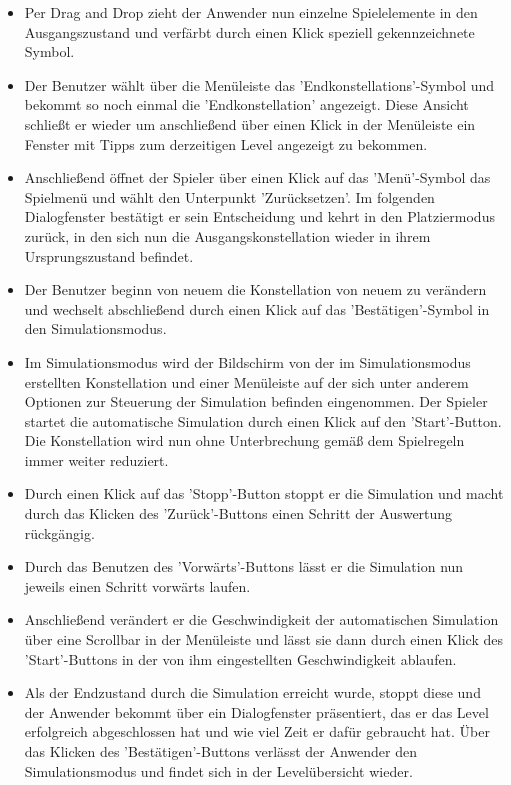 \begin{requirements}
\begin{itemize}
  			\item Per Drag and Drop zieht der Anwender nun einzelne Spielelemente in den Ausgangszustand und verfärbt durch einen Klick speziell gekennzeichnete Symbol.
  			
  			\item Der Benutzer wählt über die Menüleiste das 'Endkonstellations'-Symbol und bekommt so noch einmal die 'Endkonstellation' angezeigt. Diese Ansicht schließt er wieder um anschließend über einen Klick in der Menüleiste ein Fenster mit Tipps zum derzeitigen Level angezeigt zu bekommen. 
  			
  			\item Anschließend öffnet der Spieler über einen Klick auf das 'Menü'-Symbol das Spielmenü und wählt den Unterpunkt 'Zurücksetzen'. Im folgenden Dialogfenster bestätigt er sein Entscheidung und kehrt in den Platziermodus zurück, in den sich nun die Ausgangskonstellation wieder in ihrem Ursprungszustand befindet. 
  			
  			\item Der Benutzer beginn von neuem die Konstellation von neuem zu verändern und wechselt abschließend durch einen Klick auf das 'Bestätigen'-Symbol in den Simulationsmodus.
  			
  			\item Im Simulationsmodus wird der Bildschirm von der im Simulationsmodus erstellten Konstellation und einer Menüleiste auf der sich unter anderem Optionen zur Steuerung der Simulation befinden eingenommen. Der  Spieler startet die automatische Simulation durch einen Klick auf den 'Start'-Button. Die Konstellation wird nun ohne Unterbrechung gemäß dem Spielregeln immer weiter reduziert. 
  			
  			\item Durch einen Klick auf das 'Stopp'-Button stoppt er die Simulation und macht durch das Klicken des 'Zurück'-Buttons einen Schritt der Auswertung rückgängig. 
  			
  			\item Durch das Benutzen des 'Vorwärts'-Buttons lässt er die Simulation nun jeweils einen Schritt vorwärts laufen. 
  			
  			\item Anschließend verändert er die Geschwindigkeit der automatischen Simulation über eine Scrollbar in der Menüleiste und lässt 
sie dann durch einen Klick des 'Start'-Buttons in der von ihm eingestellten Geschwindigkeit ablaufen. 
  			
  			\item Als der Endzustand durch die Simulation erreicht wurde, stoppt diese und der Anwender bekommt über ein Dialogfenster präsentiert, das er das Level erfolgreich abgeschlossen hat und wie viel Zeit er dafür gebraucht hat. Über das Klicken des 'Bestätigen'-Buttons verlässt der Anwender den Simulationsmodus und findet sich in der Levelübersicht wieder.
  			

\end{itemize}
\end{requirements}

